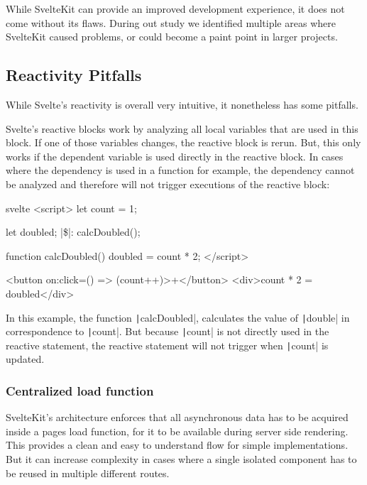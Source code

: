 While SvelteKit can provide an improved development experience, it does not come without its flaws. During out study we identified multiple areas where SvelteKit caused problems, or could become a paint point in larger projects.

\subsection{Reactivity Pitfalls}

While Svelte's reactivity is overall very intuitive, it nonetheless has some pitfalls.

Svelte's reactive blocks work by analyzing all local variables that are used in this block. If one of those variables changes, the reactive block is rerun. But, this only works if the dependent variable is used directly in the reactive block. In cases where the dependency is used in a function for example, the dependency cannot be analyzed and therefore will not trigger executions of the reactive block:

\begin{myminted}[escapeinside=||, autogobble]{svelte}{}
<script>
    let count = 1;

    let doubled;
    |\$|: calcDoubled();

    function calcDoubled() {
    doubled = count * 2;
    }
</script>

<button on:click={() => (count++)}>+</button>
<div>{count} * 2 = {doubled}</div>
\end{myminted}

In this example, the function \texttt|calcDoubled|, calculates the value of \texttt|double| in correspondence to \texttt|count|. But because \texttt|count| is not directly used in the reactive statement, the reactive statement will not trigger when \texttt|count| is updated.

\subsubsection{Centralized load function}

SvelteKit's architecture enforces that all asynchronous data has to be acquired inside a pages load function, for it to be available during server side rendering. This provides a clean and easy to understand flow for simple implementations. But it can increase complexity in cases where a single isolated component has to be reused in multiple different routes.

